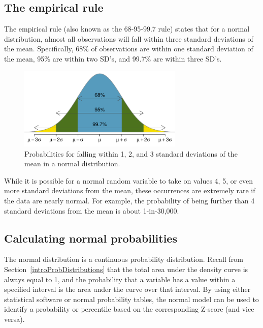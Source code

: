 

\textD{\newpage}


\subsection{The empirical rule}\label{empiricalRule}

The empirical rule (also known as the 68-95-99.7 rule) states that for a normal distribution, almost all observations will fall within three standard deviations of the mean. Specifically, 68\% of observations are within one standard deviation of the mean, 95\% are within two SD's, and 99.7\% are within three SD's. 

\begin{figure}[h]
	\centering
	\includegraphics[width=0.7\textwidth]{ch_distributions_oi_biostat/figures/6895997/6895997}
	\caption{Probabilities for falling within 1, 2, and 3 standard deviations of the mean in a normal distribution.}
	\label{6895997}
\end{figure}

While it is possible for a normal random variable to take on values 4, 5, or even more standard deviations from the mean, these occurrences are extremely rare if the data are nearly normal. For example, the probability of being further than 4 standard deviations from the mean is about 1-in-30,000.

\subsection{Calculating normal probabilities}

The normal distribution is a continuous probability distribution. Recall from Section~\ref{introProbDistributions} that the total area under the density curve is always equal to 1, and the probability that a variable has a value within a specified interval is the area under the curve over that interval. By using either statistical software or normal probability tables, the normal model can be used to identify a probability or percentile based on the corresponding Z-score (and vice versa). 

